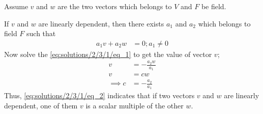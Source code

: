 Assume $v$ and $w$ are the two vectors which belongs to $V$ and $F$ be field. 

If $v$ and $w$ are linearly dependent, then there exists $a_1$ and $a_2$ which belongs to field $F$ such that
\begin{align}\label{eq:solutions/2/3/1/eq_1}
    a_1v + a_2w &= 0; a_1 \ne 0
\end{align}
Now solve the \eqref{eq:solutions/2/3/1/eq_1} to get the value of vector $v$;
\begin{align}
    v &= -\frac{a_2w}{a_1} \\
    v &= cw\label{eq:solutions/2/3/1/eq_2} \\
    \implies c &= -\frac{a_2}{a_1}
\end{align}
Thus, \eqref{eq:solutions/2/3/1/eq_2} indicates that if two vectors $v$ and $w$ are linearly dependent, one of them $v$ is a scalar multiple of the other $w$.
